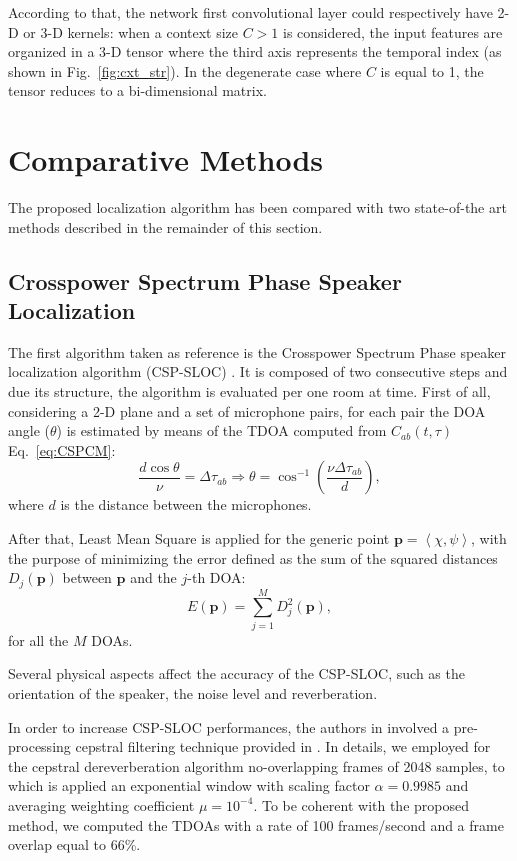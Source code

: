 \documentclass[review]{elsarticle}
\newcommand{\figref}[1]{Fig.~\ref{#1}}
\let\originaleqref=\eqref
\renewcommand{\eqref}{Eq.~\originaleqref}
\begin{document}
According to that, the network first convolutional layer could respectively have 2-D or 3-D kernels: when a context size $C > 1$ is considered, the input features are organized in a 3-D tensor where the third axis represents the temporal index (as shown in \figref{fig:cxt_str}). In the degenerate case where $C$ is equal to 1, the tensor reduces to a bi-dimensional matrix.


\section{Comparative Methods}
\label{sec:comp_meth}
The proposed localization algorithm has been compared with two state-of-the art methods described in the remainder of this section.

\subsection{Crosspower Spectrum Phase Speaker Localization}
\label{sec:soa_met}
The first algorithm taken as reference is the Crosspower Spectrum Phase speaker localization algorithm (CSP-SLOC) \cite{tsiami2014experiments}. It is composed of two consecutive steps and due its structure, the algorithm is evaluated per one room at time.  First of all, considering a 2-D plane and a set of microphone pairs, for each pair the DOA angle ($\theta$) is estimated by means of the TDOA computed from $C_{ab}(t,\tau)$ \eqref{eq:CSPCM}:
\begin{equation}
\frac{d \cos \theta}{\nu} = \Delta\tau_{ab}  \Rightarrow \theta = \cos^{-1}  \left( \frac{\nu \Delta\tau_{ab} }{d} \right), 
\end{equation}
where $d$ is the distance between the microphones.

After that, Least Mean Square is applied for the generic point $\mathbf{p}= \left \langle \chi,\psi \right \rangle $, with the purpose of minimizing the error defined as the sum of the squared distances $D_j(\mathbf{p})$ between $\mathbf{p}$ and the $j$-th DOA:
\begin{equation}
E(\mathbf{p}) = \sum_{j=1}^M D^2_j (\mathbf{p}),
\end{equation}
for all the $M$ DOAs.

Several physical aspects affect the accuracy of the CSP-SLOC, such as the orientation of the speaker, the noise level and reverberation.

In order to increase CSP-SLOC performances, the authors in \cite{tsiami2014experiments} involved a pre-processing cepstral filtering technique provided in \cite{stephenne1997new}. In details, we employed for the cepstral dereverberation algorithm no-overlapping frames of 2048 samples, to which is applied an exponential window with scaling factor $\alpha = 0.9985$ and averaging weighting coefficient $\mu=10^{-4}$. To be coherent with the proposed method, we computed the TDOAs with a rate of 100 frames/second and a frame overlap equal to 66\%.
\end{document}
